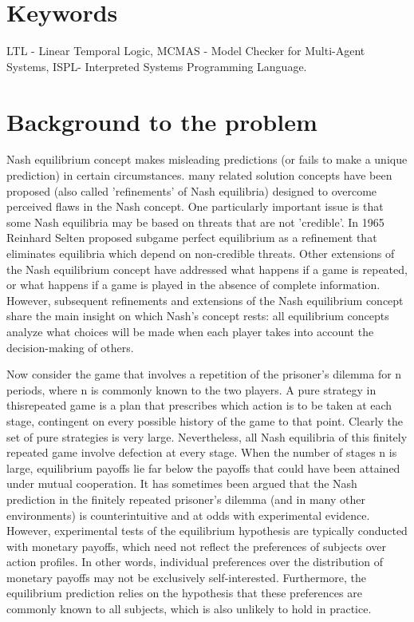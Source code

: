 \documentclass[14pt, a4paper]{article}
\begin{document}
				

			\section{Keywords}
			
				LTL - Linear Temporal Logic, MCMAS - Model Checker for Multi-Agent Systems, ISPL- Interpreted Systems Programming Language.

				

			\section{Background to the problem}
 Nash equilibrium concept  makes misleading predictions (or fails to make a unique prediction) in certain circumstances.  many related solution concepts have been proposed  (also called 'refinements' of Nash equilibria) designed to overcome perceived flaws in the Nash concept. One particularly important issue is that some Nash equilibria may be based on threats that are not 'credible'. In 1965 Reinhard Selten proposed subgame perfect equilibrium as a refinement that eliminates equilibria which depend on non-credible threats. Other extensions of the Nash equilibrium concept have addressed what happens if a game is repeated, or what happens if a game is played in the absence of complete information. However, subsequent refinements and extensions of the Nash equilibrium concept share the main insight on which Nash's concept rests: all equilibrium concepts analyze what choices will be made when each player takes into account the decision-making of others.

Now consider the game that involves a repetition of the prisoner’s dilemma for n periods, where n is commonly known to the two players. A pure strategy in thisrepeated game is a plan that prescribes which action is to be taken at each stage, contingent on every possible history
of the game to that point. Clearly the set of pure strategies is very large. Nevertheless, all Nash equilibria of this finitely repeated game involve defection at every stage. When the number of stages n is large, equilibrium payoffs lie far below the payoffs that could have been
attained under mutual cooperation. It has sometimes been argued that the Nash prediction in the finitely repeated prisoner’s dilemma (and in many other environments) is counterintuitive and at odds with experimental evidence. However, experimental tests
of the equilibrium hypothesis are typically conducted with monetary payoffs, which need not reflect the preferences of subjects over action profiles. In other words, individual preferences over the distribution of monetary payoffs may not be exclusively self-interested.
Furthermore, the equilibrium prediction relies on the hypothesis that these preferences are commonly known to all subjects, which is also unlikely to hold in practice.
\end{document}
